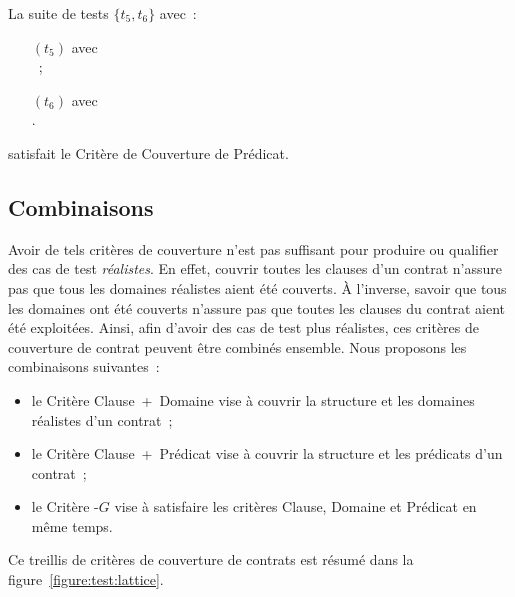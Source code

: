 \begin{example}

La suite de tests $\{t_5, t_6\}$ avec~:
%
\begin{itemize}

\item[$(t_5)$]  avec \\
~;

\item[$(t_6)$]  avec \\
.

\end{itemize}
%
satisfait le Critère de Couverture de Prédicat.

\end{example}

\subsection{Combinaisons}

Avoir de tels critères de couverture n'est pas suffisant pour produire ou
qualifier des cas de test {\em réalistes}. En effet, couvrir toutes les clauses
d'un contrat n'assure pas que tous les domaines réalistes aient été couverts. À
l'inverse, savoir que tous les domaines ont été couverts n'assure pas que toutes
les clauses du contrat aient été exploitées. Ainsi, afin d'avoir des cas de test
plus réalistes, ces critères de couverture de contrat peuvent être combinés
ensemble.  Nous proposons les combinaisons suivantes~:
%
\begin{itemize}

\item le Critère Clause~+~Domaine vise à couvrir la structure et les domaines
réalistes d'un contrat~;

\item le Critère Clause~+~Prédicat vise à couvrir la structure et les prédicats
d'un contrat~;

\item le Critère -$G$ vise à satisfaire les critères Clause,
Domaine et Prédicat en même temps.

\end{itemize}
%
Ce {\strong treillis} de critères de couverture de contrats est résumé dans la
figure~\ref{figure:test:lattice}.

